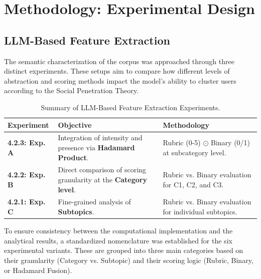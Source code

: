 \section{Methodology: Experimental Design}

    
    \subsection{LLM-Based Feature Extraction}

The semantic characterization of the corpus was approached through three distinct experiments. These setups aim to compare how different levels of abstraction and scoring methods impact the model's ability to cluster users according to the Social Penetration Theory.

\begin{table}[htbp]
\centering
\caption{Summary of LLM-Based Feature Extraction Experiments.}
\label{tab:llm_experiments}
\begin{tabular}{@{}lp{6cm}p{4.5cm}@{}}
\toprule
\textbf{Experiment} & \textbf{Objective} & \textbf{Methodology} \\ \midrule
\textbf{4.2.3: Exp. A} & Integration of intensity and presence via \textbf{Hadamard Product}. & Rubric (0-5) $\odot$ Binary (0/1) at subcategory level. \\
\textbf{4.2.2: Exp. B} & Direct comparison of scoring granularity at the \textbf{Category level}. & Rubric vs. Binary evaluation for C1, C2, and C3. \\
\textbf{4.2.1: Exp. C} & Fine-grained analysis of \textbf{Subtopics}. & Rubric vs. Binary evaluation for individual subtopics. \\ \bottomrule
\end{tabular}
\end{table}



To ensure consistency between the computational implementation and the analytical results, a standardized nomenclature was established for the six experimental variants. These are grouped into three main categories based on their granularity (Category vs. Subtopic) and their scoring logic (Rubric, Binary, or Hadamard Fusion).

